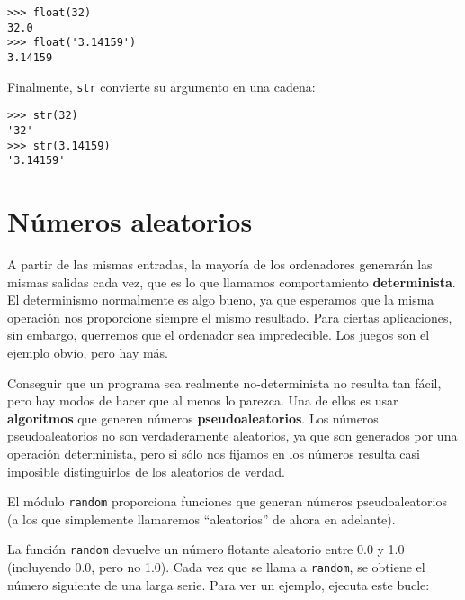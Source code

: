 
\beforeverb
\begin{verbatim}
>>> float(32)
32.0
>>> float('3.14159')
3.14159
\end{verbatim}
\afterverb
%
Finalmente, {\tt str} convierte su argumento en una cadena:


\beforeverb
\begin{verbatim}
>>> str(32)
'32'
>>> str(3.14159)
'3.14159'
\end{verbatim}
\afterverb
%

\section{Números aleatorios}


A partir de las mismas entradas, la mayoría de los ordenadores generarán
las mismas salidas cada vez, que es lo que llamamos comportamiento {\bf determinista}.
El determinismo normalmente es algo bueno, ya que esperamos que la misma
operación nos proporcione siempre el mismo resultado. Para ciertas aplicaciones, sin embargo,
querremos que el ordenador sea impredecible. Los juegos son el ejemplo
obvio, pero hay más.

Conseguir que un programa sea realmente no-determinista no resulta tan fácil,
pero hay modos de hacer que al menos lo parezca. Una de ellos
es usar {\bf algoritmos} que generen números {\bf pseudoaleatorios}.
Los números pseudoaleatorios no son verdaderamente aleatorios, ya que son
generados por una operación determinista, pero si sólo nos fijamos en los números
resulta casi imposible distinguirlos de los aleatorios de verdad.


El módulo {\tt random} proporciona funciones que generan
números pseudoaleatorios (a los que simplemente llamaremos ``aleatorios''
de ahora en adelante).


La función {\tt random} devuelve un número flotante aleatorio
entre 0.0 y 1.0 (incluyendo 0.0, pero no 1.0). Cada vez que se
llama a {\tt random}, se obtiene el número siguiente de una larga serie. Para ver
un ejemplo, ejecuta este bucle:

